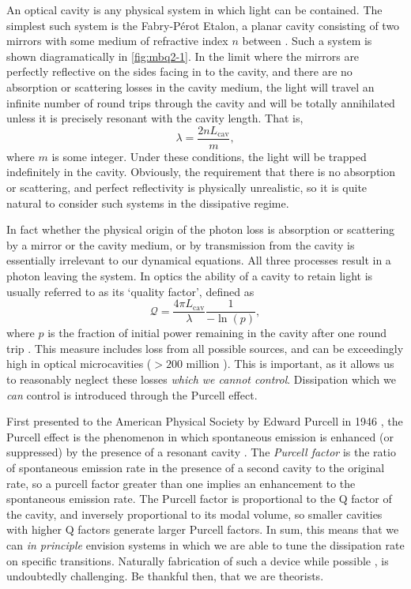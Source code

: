 An optical cavity is any physical system in which light can be contained. The simplest such system is the Fabry-P\'{e}rot Etalon, a planar cavity consisting of two mirrors with some medium of refractive index \(n\) between \cite{PF1899,Fox_OC}. Such a system is shown diagramatically in \cref{fig:mbq2-1}. In the limit where the mirrors are perfectly reflective on the sides facing in to the cavity, and there are no absorption or scattering losses in the cavity medium, the light will travel an infinite number of round trips through the cavity and will be totally annihilated unless it is precisely resonant with the cavity length. That is,
\begin{equation}
	\lambda = \frac{2nL_{\mathrm{cav}}}{m},
	\label{eq:mbq2-2}
\end{equation}
where \(m\) is some integer. Under these conditions, the light will be trapped indefinitely in the cavity. Obviously, the requirement that there is no absorption or scattering, and perfect reflectivity is physically unrealistic, so it is quite natural to consider such systems in the dissipative regime.

In fact whether the physical origin of the photon loss is absorption or scattering by a mirror or the cavity medium, or by transmission from the cavity is essentially irrelevant to our dynamical equations. All three processes result in a photon leaving the system. In optics the ability of a cavity to retain light is usually referred to as its `quality factor', defined as
\begin{equation}
	\mathcal{Q} = \frac{4\pi L_{\mathrm{cav}}}{\lambda} \frac{1}{-\ln(p)},
	\label{eq:mbq2-3}
\end{equation}
where \(p\) is the fraction of initial power remaining in the cavity after one round trip \cite{Siegman_chp11}. This measure includes loss from all possible sources, and can be exceedingly high in optical microcavities (\(>200\) million \cite{YOLYYV17}). This is important, as it allows us to reasonably neglect these losses \emph{which we cannot control}. Dissipation which we \emph{can} control is introduced through the Purcell effect.

First presented to the American Physical Society by Edward Purcell in 1946 \cite{Purcell46}, the Purcell effect is the phenomenon in which spontaneous emission is enhanced (or suppressed) by the presence of a resonant cavity \cite{Fox_Purcell}. The \emph{Purcell factor} is the ratio of spontaneous emission rate in the presence of a second cavity to the original rate, so a purcell factor greater than one implies an enhancement to the spontaneous emission rate. The Purcell factor is proportional to the Q factor of the cavity, and inversely proportional to its modal volume, so smaller cavities with higher Q factors generate larger Purcell factors. In sum, this means that we can \emph{in principle} envision systems in which we are able to tune the dissipation rate on specific transitions. Naturally fabrication of such a device while possible \cite{GSGLCTM98}, is undoubtedly challenging. Be thankful then, that we are theorists.   

